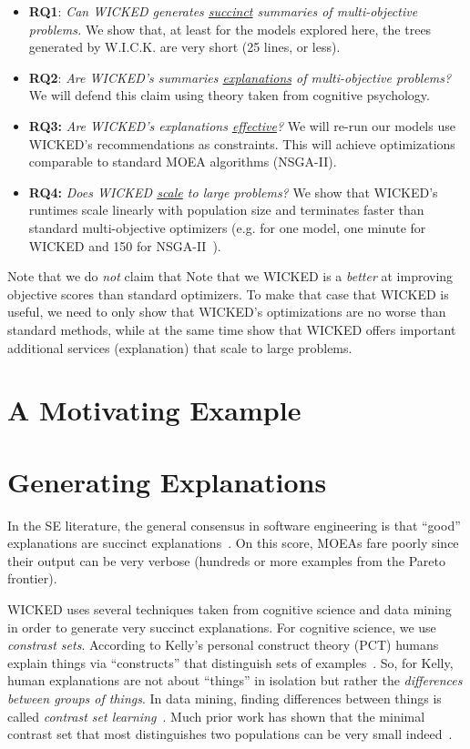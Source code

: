 \documentclass[runningheads]{llncs}
\newcommand{\bi}{\begin{itemize}}
\newcommand{\ei}{\end{itemize}}
\begin{document}
\bi
\item[{\bf RQ1}:] {\em Can WICKED generates \underline{succinct} summaries of multi-objective problems.} 
We show that, at least for the models explored here, the trees
generated by W.I.C.K. are very short (25 lines, or less).
\item[{\bf RQ2}:] {\em Are WICKED's summaries \underline{explanations} of multi-objective problems?}
We will defend this claim using theory taken from cognitive psychology.
\item[{\bf RQ3:}] {\em Are WICKED's  explanations \underline{effective}?}
We will re-run our models use WICKED's 
recommendations as constraints. This will  achieve optimizations comparable
to standard MOEA algorithms (NSGA-II).
\item [{\bf RQ4:}] {\em Does WICKED \underline{scale} to large problems?}
 We show that WICKED's
runtimes scale linearly with population size and terminates
faster than standard multi-objective optimizers
 (e.g. for one model, one minute for WICKED and 150 for NSGA-II~\cite{deb00a}).
\ei
Note that we do {\em not} claim that Note that we WICKED is a
{\em better} at improving objective
scores than standard optimizers.  To make that case that WICKED is useful,
we need to only show that WICKED's optimizations are no worse than standard methods,
while at the same time show that WICKED offers important additional services (explanation)
that scale to large problems.


\section{A Motivating Example}


\section{Generating Explanations}
In the SE literature,
the general consensus in
software engineering is that ``good'' explanations
are succinct explanations~\cite{ag98,dej13z,fenton99}.
On this score, MOEAs fare poorly since their output can be very verbose
(hundreds or more examples from the Pareto frontier).

WICKED uses several techniques taken from cognitive science
and data mining in order to generate very succinct explanations.
For cognitive science, we use {\em constrast sets}.
According to Kelly's personal
construct theory (PCT) humans explain things via
``constructs'' that distinguish sets of examples~\cite{kelly55}.
So, for Kelly, human explanations are not about
``things'' in isolation but rather the {\em
differences between groups of things}. In data mining, finding
differences between things is called {\em contrast set learning}~\cite{webb09}.
Much prior work has shown that the minimal contrast set that most
distinguishes two populations  can be very small 
indeed~\cite{me03c,hu02,me07,ying02}. 
\end{document}
